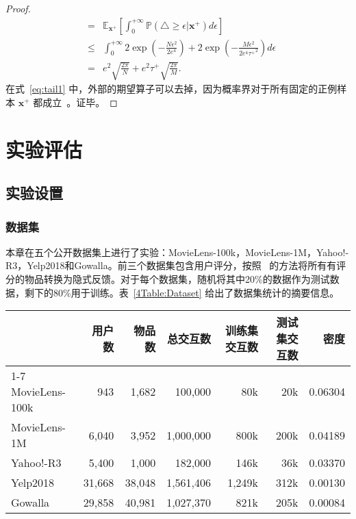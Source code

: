 \begin{lemma}
\begin{proof}
\begin{eqnarray}
			&=&  \mathbb{E}_{\mathbf{x}^+} \left[\int_{0}^{+\infty} \mathbb{P}(\triangle \geq \epsilon|\mathbf{x}^+)d\epsilon \right] \label{eq:tail1} \\
			&\leq& \int_{0}^{+\infty}  2\exp \left(-\frac{N\epsilon^2}{2e^4} \right)+2\exp \left(-\frac{M\epsilon^2}{2e^4{\tau^+}^2}  \right) d \epsilon \nonumber\\
			&=& e^2\sqrt{\frac{2\pi}{N}} + e^2\tau^+\sqrt{\frac{2\pi}{M}}.
		\end{eqnarray}
在式~\eqref{eq:tail1} 中，外部的期望算子可以去掉，因为概率界对于所有固定的正例样本 $\mathbf{x}^+$ 都成立~\cite{Chuang:2020:NIPS}。证毕。
	\end{proof}
\end{lemma}

\section{实验评估}\label{pairsec:exp}
\subsection{实验设置}
\subsubsection{数据集}
本章在五个公开数据集上进行了实验：MovieLens-100k，MovieLens-1M，Yahoo!-R3，Yelp2018和Gowalla。前三个数据集包含用户评分，按照~\cite{Steffen:2009:UAI,Zhang:2013:SIGIR,Steffen:2014:WSDM} 的方法将所有有评分的物品转换为隐式反馈。对于每个数据集，随机将其中20\%的数据作为测试数据，剩下的80\%用于训练。表~\ref{4Table:Dataset} 给出了数据集统计的摘要信息。
\begin{table*}[h!]
	\centering
	\small
	\caption{数据集统计}\label{4Table:Dataset}
	\begin{tabular}{lrrrrrr}
		\toprule[1.2pt]
		~           & 用户数  & 物品数  &总交互数 & 训练集交互数  &测试集交互数&密度 \\ \cline{1-7}
		MovieLens-100k   &   943    &  1,682   &100,000&    80k	   & 20k &0.06304\\
		MovieLens-1M    &   6,040  &  3,952   &1,000,000&  800k     & 200k&0.04189  \\
		Yahoo!-R3       &   5,400  &  1,000  &182,000 &   146k      & 36k&0.03370\\
		Yelp2018       &   31,668  &  38,048&   1,561,406&   1,249k     & 312k&0.00130  \\
		Gowalla       &   29,858 &  40,981  &1,027,370 &   821k     & 205k&0.00084 \\
		\bottomrule[1.2pt]
	\end{tabular}
\end{table*}
